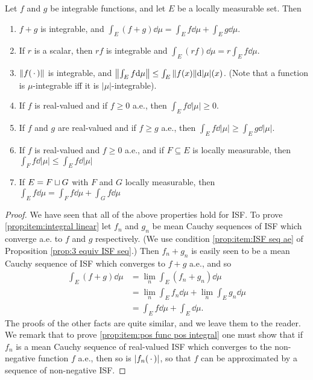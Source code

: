 \begin{proposition}
Let $f$ and $g$ be integrable functions, and let $E$ be a locally measurable set. Then
\begin{enumerate}
    \item\label{prop:item:integral linear}
    $f+g$ is integrable, and $\int_E(f+g)\dd\mu=\int_Ef\dd\mu+\int_Eg\dd\mu$.

    \item\label{prop:item:integral homogeneity}
    If $r$ is a scalar, then $rf$ is integrable and $\int_E(rf)\dd\mu=r\int_Ef\dd\mu$.

    \item $\norm{f(\,\cdot\,)}$ is integrable, and $\norm{\int_Ef\dd\mu}\leq\int_E\norm{f(x)}\dd|\mu|(x)$. (Note that a function is $\mu$-integrable iff it is $|\mu|$-integrable).

    \item\label{prop:item:pos func pos integral}
    If $f$ is real-valued and if $f\geq0$ a.e., then $\int_Ef\dd|\mu|\geq0$.

    \item\label{prop:item:integral preserve order}
    If $f$ and $g$ are real-valued and if $f\geq g$ a.e., then $\int_Ef\dd|\mu|\geq\int_Eg\dd|\mu|$.

    \item If $f$ is real-valued and $f\geq0$ a.e., and if $F\subseteq E$ is locally measurable, then $\int_Ff\dd|\mu|\leq\int_Ef\dd|\mu|$

    \item\label{prop:item:integral on disjoint sets}
    If $E=F\sqcup G$ with $F$ and $G$ locally measurable, then $\int_Ef\dd\mu=\int_Ff\dd\mu+\int_Gf\dd\mu$
\end{enumerate}
\end{proposition}

\begin{proof}
We have seen that all of the above properties hold for ISF. To prove \ref{prop:item:integral linear} let $f_n$ and $g_n$ be mean Cauchy sequences of ISF which converge a.e. to $f$ and $g$ respectively. (We use condition \ref{prop:item:ISF seq ae} of Proposition \ref{prop:3 equiv ISF seq}.) Then $f_n+g_n$ is easily seen to be a mean Cauchy sequence of ISF which converges to $f+g$ a.e., and so
\begin{align*}
    \int_E(f+g)\dd\mu&=\lim_n\int_E(f_n+g_n)\dd\mu\\
    &=\lim_n\int_Ef_n\dd\mu+\lim_n\int_Eg_n\dd\mu\\
    &=\int_Ef\dd\mu+\int_E\dd\mu.
\end{align*}
The proofs of the other facts are quite similar, and we leave them to the reader. We remark that to prove \ref{prop:item:pos func pos integral} one must show that if $f_n$ is a mean Cauchy sequence of real-valued ISF which converges to the non-negative function $f$ a.e., then so is $|f_n(\,\cdot\,)|$, so that $f$ can be approximated by a sequence of non-negative ISF.
\end{proof}

